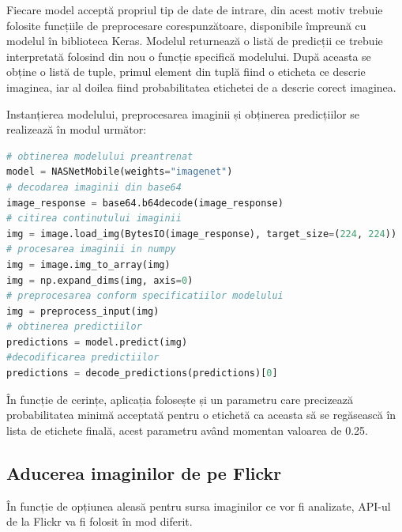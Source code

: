 Fiecare model acceptă propriul tip de date de intrare, din acest motiv trebuie folosite funcțiile de preprocesare corespunzătoare, disponibile împreună cu modelul în biblioteca Keras. Modelul returnează o listă de predicții ce trebuie interpretată folosind din nou o funcție specifică modelului. După aceasta se obține  o listă de tuple, primul element din tuplă fiind o eticheta ce  descrie imaginea, iar al doilea fiind probabilitatea etichetei de a descrie corect imaginea.

Instanțierea modelului, preprocesarea imaginii și obținerea predicțiilor se realizează în modul următor:

 
 
 
\lstset{style=mystyle}

\begin{lstlisting}[language=Python]
# obtinerea modelului preantrenat
model = NASNetMobile(weights="imagenet")
# decodarea imaginii din base64
image_response = base64.b64decode(image_response)
# citirea continutului imaginii
img = image.load_img(BytesIO(image_response), target_size=(224, 224))
# procesarea imaginii in numpy
img = image.img_to_array(img)
img = np.expand_dims(img, axis=0)
# preprocesarea conform specificatiilor modelului
img = preprocess_input(img)
# obtinerea predictiilor
predictions = model.predict(img)
#decodificarea predictiilor
predictions = decode_predictions(predictions)[0]
\end{lstlisting}

În funcție de cerințe, aplicația folosește și un parametru care precizează probabilitatea minimă acceptată pentru o etichetă ca aceasta să se regăsească în lista de etichete finală, acest parametru având momentan valoarea de 0.25.

\subsection{Aducerea imaginilor de pe Flickr}
În funcție de opțiunea aleasă pentru sursa imaginilor ce vor fi analizate, API-ul de la Flickr va fi folosit în mod diferit.

